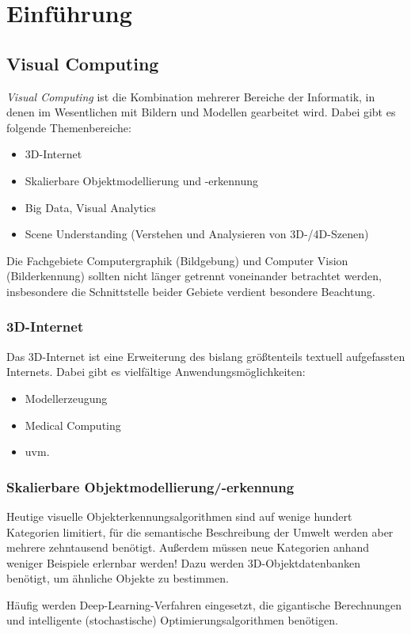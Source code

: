 \chapter{Einführung}
	\section{Visual Computing}
		\emph{Visual Computing} ist die Kombination mehrerer Bereiche der Informatik, in denen im Wesentlichen mit Bildern und Modellen gearbeitet wird. Dabei gibt es \zB folgende Themenbereiche:
		\begin{itemize}
			\item 3D-Internet
			\item Skalierbare Objektmodellierung und -erkennung
			\item Big Data, Visual Analytics
			\item Scene Understanding (Verstehen und Analysieren von 3D-/4D-Szenen)
		\end{itemize}
		Die Fachgebiete Computergraphik (Bildgebung) und Computer Vision (Bilderkennung) sollten nicht länger getrennt voneinander betrachtet werden, insbesondere die Schnittstelle beider Gebiete verdient besondere Beachtung.

		\subsection{3D-Internet}
			Das 3D-Internet ist eine Erweiterung des bislang größtenteils textuell aufgefassten Internets. Dabei gibt es vielfältige Anwendungsmöglichkeiten:
			\begin{itemize}
				\item Modellerzeugung
				\item Medical Computing
				\item uvm.
			\end{itemize}

		\subsection{Skalierbare Objektmodellierung/-erkennung}
			Heutige visuelle Objekterkennungsalgorithmen sind auf wenige hundert Kategorien limitiert, für die semantische Beschreibung der Umwelt werden aber mehrere zehntausend benötigt. Außerdem müssen neue Kategorien anhand weniger Beispiele erlernbar werden! Dazu werden 3D-Objektdatenbanken benötigt, um ähnliche Objekte zu bestimmen.
			
			Häufig werden Deep-Learning-Verfahren eingesetzt, die gigantische Berechnungen und intelligente (stochastische) Optimierungsalgorithmen benötigen.

